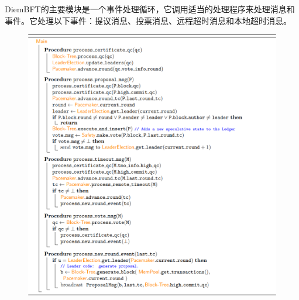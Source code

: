 DiemBFT的主要模块是一个事件处理循环，它调用适当的处理程序来处理消息和事件。它处理以下事件：提议消息、投票消息、远程超时消息和本地超时消息。

\begin{figure}[H]
    \centering
    \includegraphics[width=12cm]{figures/code1-1.png}
\end{figure}

  






